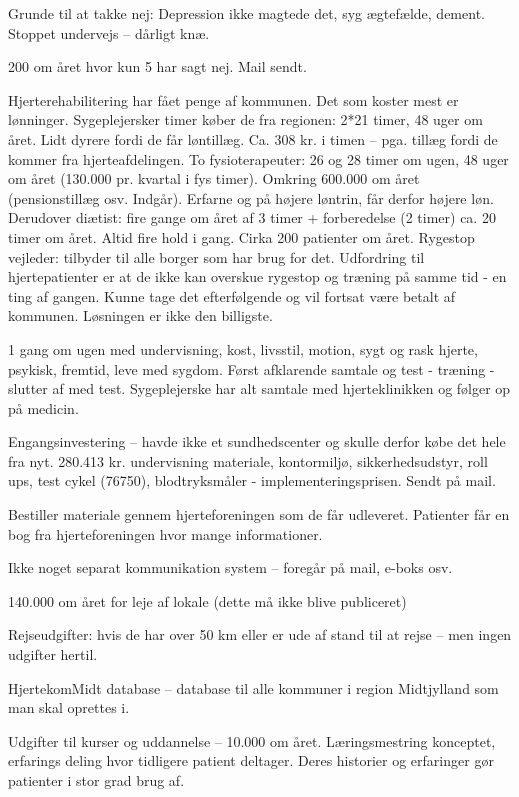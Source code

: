 Grunde til at takke nej: Depression ikke magtede det, syg ægtefælde, dement. Stoppet undervejs – dårligt knæ. 

200 om året hvor kun 5 har sagt nej. Mail sendt. 

Hjerterehabilitering har fået penge af kommunen. 
Det som koster mest er lønninger. 
Sygeplejersker timer køber de fra regionen: 2*21 timer, 48 uger om året. Lidt dyrere fordi de får løntillæg. Ca. 308 kr. i timen – pga. tillæg fordi de kommer fra hjerteafdelingen. 
To fysioterapeuter: 26 og 28 timer om ugen, 48 uger om året (130.000 pr. kvartal i fys timer). Omkring 600.000 om året (pensionstillæg osv. Indgår). Erfarne og på højere løntrin, får derfor højere løn. 
Derudover diætist: fire gange om året af 3 timer + forberedelse (2 timer) ca. 20 timer om året.  
Altid fire hold i gang. Cirka 200 patienter om året. 
Rygestop vejleder: tilbyder til alle borger som har brug for det. Udfordring til hjertepatienter er at de ikke kan overskue rygestop og træning på samme tid - en ting af gangen. Kunne tage det efterfølgende og vil fortsat være betalt af kommunen. 
Løsningen er ikke den billigste. 

1 gang om ugen med undervisning, kost, livsstil, motion, sygt og rask hjerte, psykisk, fremtid, leve med sygdom. Først afklarende samtale og test - træning - slutter af med test. Sygeplejerske har alt samtale med hjerteklinikken og følger op på medicin.   

Engangsinvestering – havde ikke et sundhedscenter og skulle derfor købe det hele fra nyt. 280.413 kr. undervisning materiale, kontormiljø, sikkerhedsudstyr, roll ups, test cykel (76750), blodtryksmåler  - implementeringsprisen. Sendt på mail.  

Bestiller materiale gennem hjerteforeningen som de får udleveret. Patienter får en bog fra hjerteforeningen hvor mange informationer.

Ikke noget separat kommunikation system – foregår på mail, e-boks osv. 

140.000 om året for leje af lokale (dette må ikke blive publiceret) 

Rejseudgifter: hvis de har over 50 km eller er ude af stand til at rejse – men ingen udgifter hertil. 

HjertekomMidt database – database til alle kommuner i region Midtjylland som man skal oprettes i. 

Udgifter til kurser og uddannelse – 10.000 om året. 
Læringsmestring konceptet, erfarings deling hvor tidligere patient deltager. Deres historier og erfaringer gør patienter i stor grad brug af. 


